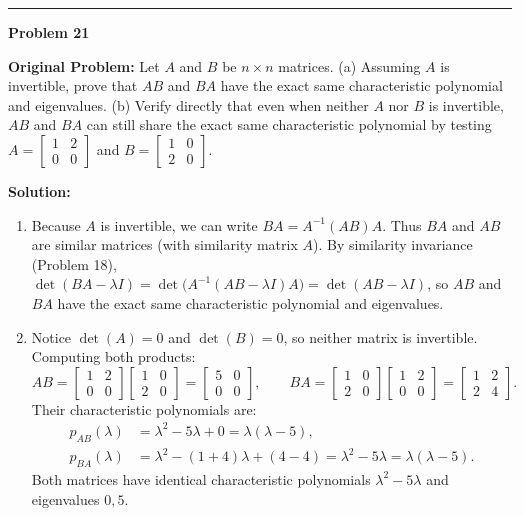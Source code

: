 \documentclass[11pt, letterpaper]{article}
\theoremstyle{definition}
\theoremstyle{remark}
\begin{document}
\noindent\rule{\textwidth}{0.4pt}

\noindent\textbf{Problem 21}

\textbf{Original Problem:} Let $A$ and $B$ be $n \times n$ matrices. (a) Assuming $A$ is invertible, prove that $AB$ and $BA$ have the exact same characteristic polynomial and eigenvalues. (b) Verify directly that even when neither $A$ nor $B$ is invertible, $AB$ and $BA$ can still share the exact same characteristic polynomial by testing $A = \begin{bmatrix} 1 & 2 \\ 0 & 0 \end{bmatrix}$ and $B = \begin{bmatrix} 1 & 0 \\ 2 & 0 \end{bmatrix}$.

\textbf{Solution:}
\begin{enumerate}[label=(\alph*), topsep=3pt, itemsep=4pt]
    \item Because $A$ is invertible, we can write $BA = A^{-1}(AB)A$. Thus $BA$ and $AB$ are similar matrices (with similarity matrix $A$). By similarity invariance (Problem 18), $\det(BA - \lambda I) = \det\big(A^{-1}(AB - \lambda I)A\big) = \det(AB - \lambda I)$, so $AB$ and $BA$ have the exact same characteristic polynomial and eigenvalues.
    \item Notice $\det(A) = 0$ and $\det(B) = 0$, so neither matrix is invertible. Computing both products:
    \[
    AB = \begin{bmatrix} 1 & 2 \\ 0 & 0 \end{bmatrix}\begin{bmatrix} 1 & 0 \\ 2 & 0 \end{bmatrix} = \begin{bmatrix} 5 & 0 \\ 0 & 0 \end{bmatrix}, \qquad
    BA = \begin{bmatrix} 1 & 0 \\ 2 & 0 \end{bmatrix}\begin{bmatrix} 1 & 2 \\ 0 & 0 \end{bmatrix} = \begin{bmatrix} 1 & 2 \\ 2 & 4 \end{bmatrix}.
    \]
    Their characteristic polynomials are:
    \begin{align*}
    p_{AB}(\lambda) &= \lambda^2 - 5\lambda + 0 = \lambda(\lambda - 5), \\
    p_{BA}(\lambda) &= \lambda^2 - (1 + 4)\lambda + (4 - 4) = \lambda^2 - 5\lambda = \lambda(\lambda - 5).
    \end{align*}
    Both matrices have identical characteristic polynomials $\lambda^2 - 5\lambda$ and eigenvalues $0, 5$.
\end{enumerate}
\end{document}
